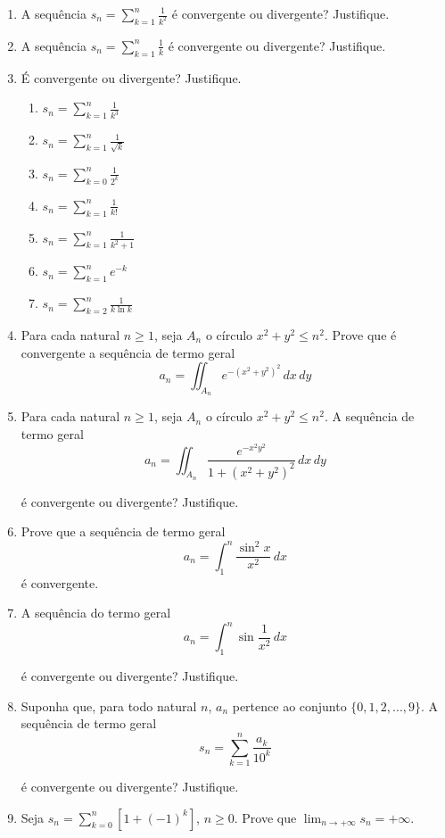 \documentclass[11pt,a4paper]{article}
\newcommand{\limite}{\displaystyle\lim}
\newcommand{\integral}{\displaystyle\int}
\newcommand{\somatorio}{\displaystyle\sum}
\begin{document}
\begin{enumerate}
\begin{enumerate}
		\end{enumerate}
		
		\item A sequência $s_n = \somatorio_{k=1}^{n} \displaystyle \frac{1}{k^2}$ é convergente ou divergente? Justifique.	
		
		\item A sequência $s_n = \somatorio_{k=1}^{n} \displaystyle \frac{1}{k}$ é convergente ou divergente? Justifique.	
		
		\item É convergente ou divergente? Justifique.
		\begin{enumerate}
			\item $s_n = \somatorio_{k=1}^{n} \displaystyle \frac{1}{k^3}$
			\item $s_n = \somatorio_{k=1}^{n} \displaystyle \frac{1}{\sqrt{k}}$	
			\item $s_n = \somatorio_{k=0}^{n} \displaystyle \frac{1}{2^k}$	
			\item $s_n = \somatorio_{k=1}^{n} \displaystyle \frac{1}{k!}$
			\item $s_n = \somatorio_{k=1}^{n} \displaystyle \frac{1}{k^2 + 1}$
			\item $s_n = \somatorio_{k=1}^{n} e^{-k}$
			\item $s_n = \somatorio_{k=2}^{n} \displaystyle \frac{1}{k \ln k}$				
		\end{enumerate}
		
		\item Para cada natural $n \geq 1$, seja $A_n$ o círculo $x^2 + y^2 \leq n^2$. Prove que é convergente a sequência de termo geral
		$$a_n = \displaystyle\iint_{A_n} e^{-(x^2 + y^2)^2} \,dx\,dy$$
		
		\item Para cada natural $n \geq 1$, seja $A_n$ o círculo $x^2 + y^2 \leq n^2$. A sequência de termo geral
		$$a_n = \displaystyle\iint_{A_n} \displaystyle\frac{e^{-x^2 y^2}}{1 + (x^2 + y^2)^2}\,dx\,dy$$
		
		é convergente ou divergente? Justifique.
		
		\item Prove que a sequência de termo geral
		$$a_n = \integral_1^{n} \displaystyle\frac{\sin^2 x}{x^2} \, dx$$
		é convergente.
		
		\item A sequência do termo geral 
		$$a_n = \integral_1^{n} \sin \displaystyle\frac{1}{x^2} \, dx$$
		
		é convergente ou divergente? Justifique.
		
		\item Suponha que, para todo natural $n$, $a_n$ pertence ao conjunto $\{0,1,2, ..., 9\}$. A sequência de termo geral 
		$$s_n = \somatorio_{k=1}^{n} \displaystyle \frac{a_k}{10^k}$$
		
		é convergente ou divergente? Justifique.
		
		\item Seja $s_n = \somatorio_{k=0}^{n} [1 + (-1)^k]$, $n \geq 0$. Prove que $\limite_{n \to +\infty} s_n = +\infty$.
		
	\end{enumerate}
	
\end{document}
